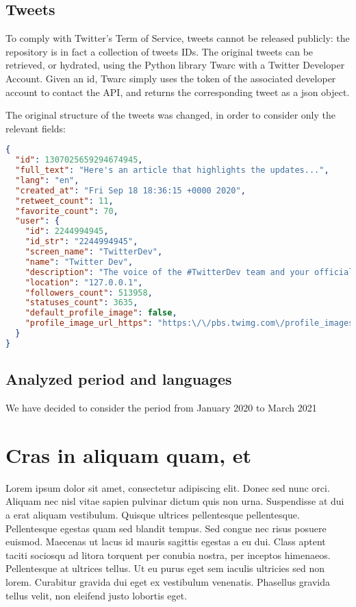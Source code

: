 \subsection{Tweets}

To comply with Twitter's Term of Service, tweets cannot be released publicly: the repository is in fact a collection of tweets IDs. The original tweets can be retrieved, or hydrated, using the Python library Twarc with a Twitter Developer Account. Given an id, Twarc simply uses the token of the associated developer account to contact the API, and returns the corresponding tweet as a json object.

The original structure of the tweets was changed, in order to consider only the relevant fields:

\begin{lstlisting}[language=json]
{
  "id": 1307025659294674945,
  "full_text": "Here's an article that highlights the updates...",
  "lang": "en",
  "created_at": "Fri Sep 18 18:36:15 +0000 2020",
  "retweet_count": 11,
  "favorite_count": 70,
  "user": {
    "id": 2244994945,
    "id_str": "2244994945",
    "screen_name": "TwitterDev",
    "name": "Twitter Dev",
    "description": "The voice of the #TwitterDev team and your official...",
    "location": "127.0.0.1",
    "followers_count": 513958,
    "statuses_count": 3635,
    "default_profile_image": false,
    "profile_image_url_https": "https:\/\/pbs.twimg.com\/profile_images\/1283786620521652229\/lEODkLTh_normal.jpg"
  }
}
\end{lstlisting}

\subsection{Analyzed period and languages}

%

We have decided to consider the period from January 2020 to March 2021


\section{Cras in aliquam quam, et}
\label{sec:456}
Lorem ipsum dolor sit amet, consectetur adipiscing elit. Donec sed nunc orci. Aliquam nec nisl vitae sapien pulvinar dictum quis non urna. Suspendisse at dui a erat aliquam vestibulum. Quisque ultrices pellentesque pellentesque. Pellentesque egestas quam sed blandit tempus. Sed congue nec risus posuere euismod. Maecenas ut lacus id mauris sagittis egestas a eu dui. Class aptent taciti sociosqu ad litora torquent per conubia nostra, per inceptos himenaeos. Pellentesque at ultrices tellus. Ut eu purus eget sem iaculis ultricies sed non lorem. Curabitur gravida dui eget ex vestibulum venenatis. Phasellus gravida tellus velit, non eleifend justo lobortis eget.


